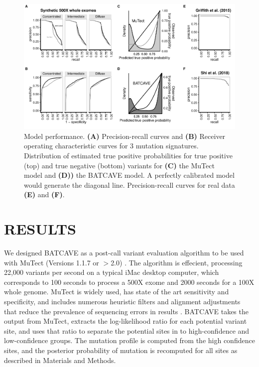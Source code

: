 \documentclass[a4,center,fleqn]{NAR}
\newcommand{\batcave}{BATCAVE }
\begin{document}
  \begin{figure}
    \begin{center}
    \includegraphics{figures/fig_wes.pdf}
    \end{center}
    \caption{Model performance.
    \textbf{(A)} Precision-recall curves and \textbf{(B)} Receiver operating characteristic curves for 3 mutation signatures.
    Distribution of estimated true positive probabilities for true positive (top) and true negative (bottom) variants for \textbf{(C)} the MuTect model and \textbf{(D))} the \batcave model.
    A perfectly calibrated model would generate the diagonal line. Precision-recall curves for real data \textbf{(E)} and \textbf{(F)}.}
  \label{NAR-wes_fig}
  \end{figure}


\section{RESULTS}
We designed \batcave as a post-call variant evaluation algorithm to be used with MuTect (Versions 1.1.7 or $>$2.0) \cite{Cibulskis2013}.
The algorithm is effecient, processing 22,000 variants per second on a typical iMac desktop computer, which corresponds to 100 seconds to process a 500X exome and 2000 seconds for a 100X whole genome.
MuTect is widely used, has state of the art sensitivity and specificity, and includes numerous heuristic filters and alignment adjustments that reduce the prevalence of sequencing errors in results \cite{Griffith2015}.
\batcave takes the output from MuTect, extracts the log-likelihood ratio for each potential variant site, and uses that ratio to separate the potential sites in to high-confidence and low-confidence groups.
The mutation profile is computed from the high confidence sites, and the posterior probability of mutation is recomputed for all sites as described in Materials and Methods.
\end{document}
